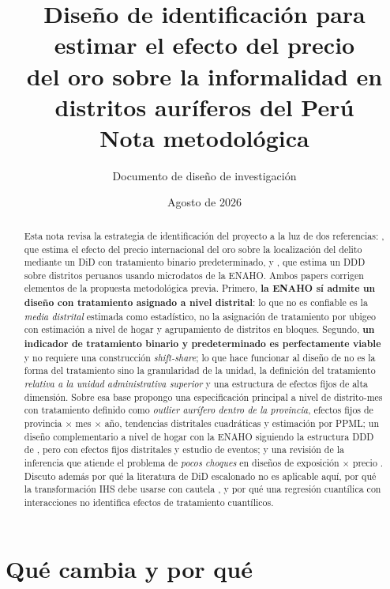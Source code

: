\documentclass[11pt,a4paper]{article}
\title{\textbf{Diseño de identificación para estimar el efecto del precio\\ del oro sobre la informalidad en distritos auríferos del Perú}\\[0.6em]
\large Nota metodológica}
\author{Documento de diseño de investigación}
\date{Agosto de 2026}
\begin{document}
\maketitle

\begin{abstract}
\noindent Esta nota revisa la estrategia de identificación del proyecto a la luz de dos referencias: \citet{braakmann2024}, que estima el efecto del precio internacional del oro sobre la localización del delito mediante un DiD con tratamiento binario predeterminado, y \citet{pecastaing2020}, que estima un DDD sobre distritos peruanos usando microdatos de la ENAHO. Ambos papers corrigen elementos de la propuesta metodológica previa. Primero, \textbf{la ENAHO sí admite un diseño con tratamiento asignado a nivel distrital}: lo que no es confiable es la \emph{media distrital} estimada como estadístico, no la asignación de tratamiento por ubigeo con estimación a nivel de hogar y agrupamiento de distritos en bloques. Segundo, \textbf{un indicador de tratamiento binario y predeterminado es perfectamente viable} y no requiere una construcción \emph{shift-share}; lo que hace funcionar al diseño de \citet{braakmann2024} no es la forma del tratamiento sino la granularidad de la unidad, la definición del tratamiento \emph{relativa a la unidad administrativa superior} y una estructura de efectos fijos de alta dimensión. Sobre esa base propongo una especificación principal a nivel de distrito-mes con tratamiento definido como \emph{outlier aurífero dentro de la provincia}, efectos fijos de provincia $\times$ mes $\times$ año, tendencias distritales cuadráticas y estimación por PPML; un diseño complementario a nivel de hogar con la ENAHO siguiendo la estructura DDD de \citet{pecastaing2020}, pero con efectos fijos distritales y estudio de eventos; y una revisión de la inferencia que atiende el problema de \emph{pocos choques} en diseños de exposición $\times$ precio \citep{adao2019}. Discuto además por qué la literatura de DiD escalonado no es aplicable aquí, por qué la transformación IHS debe usarse con cautela \citep{chen2024}, y por qué una regresión cuantílica con interacciones no identifica efectos de tratamiento cuantílicos.
\end{abstract}

\newpage
\onehalfspacing

\section{Qué cambia y por qué}
\end{document}
